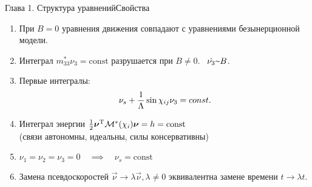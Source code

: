 \begin{frame}{Глава 1. Структура уравнений}{Свойства}    
\begin{enumerate}
    \item При $B = 0$ уравнения движения совпадают с уравнениями безынерционной модели.
    \item Интеграл $m_{33}^*\nu_3 = \mathrm{const}$ разрушается при $B \neq 0$. \ $\dot{\nu_3} \textprop B$.
    \item Первые интегралы:
    $$\nu_s + \displaystyle\frac{\displaystyle 1}{\displaystyle \Lambda}\sin\chi_{ij}\nu_3 = const.$$
    \item Интеграл энергии \quad $\frac{1}{2}\boldsymbol{\mathbf{\nu}}^\mathrm{T}\mathcal{M}^*(\chi_i)\boldsymbol{\mathbf{\nu}} = h = \mathrm{const}$\\
    (связи автономны, идеальны, силы консервативны)
    \item $\nu_1 = \nu_2 = \nu_3 = 0 \quad \implies \quad \nu_s = \mathrm{const}$
    \item Замена псевдоскоростей $\vec{\nu} \rightarrow \lambda\vec{\nu}, \lambda \neq 0$ эквивалентна замене времени $t \rightarrow \lambda t$.
\end{enumerate}
\end{frame}
